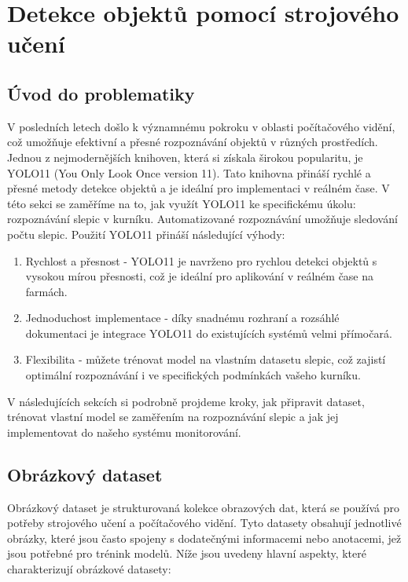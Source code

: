 \section{Detekce objektů pomocí strojového učení}\label{sec:detekce-objektu-pomoci-strojoveho-uceni}


\subsection*{Úvod do problematiky}\label{subsec:uvod-do-problematiky}
V posledních letech došlo k významnému pokroku v oblasti počítačového vidění, což umožňuje efektivní a přesné rozpoznávání objektů v různých prostředích.
Jednou z nejmodernějších knihoven, která si získala širokou popularitu, je YOLO11 (You Only Look Once version 11).
Tato knihovna přináší rychlé a přesné metody detekce objektů a je ideální pro implementaci v reálném čase.
V této sekci se zaměříme na to, jak využít YOLO11 ke specifickému úkolu: rozpoznávání slepic v kurníku.
Automatizované rozpoznávání umožňuje sledování počtu slepic.
Použití YOLO11 přináší následující výhody:

\begin{enumerate}
    \item Rychlost a přesnost - YOLO11 je navrženo pro rychlou detekci objektů s vysokou mírou přesnosti, což je ideální pro aplikování v reálném čase na farmách.
    \item Jednoduchost implementace - díky snadnému rozhraní a rozsáhlé dokumentaci je integrace YOLO11 do existujících systémů velmi přímočará.
    \item Flexibilita - můžete trénovat model na vlastním datasetu slepic, což zajistí optimální rozpoznávání i ve specifických podmínkách vašeho kurníku.
\end{enumerate}
V následujících sekcích si podrobně projdeme kroky, jak připravit dataset, trénovat vlastní model se zaměřením na rozpoznávání slepic a jak jej implementovat do našeho systému monitorování.

\subsection*{Obrázkový dataset}\label{subsec:obrazkovy-dataset}

Obrázkový dataset je strukturovaná kolekce obrazových dat, která se používá pro potřeby strojového učení a počítačového vidění.
Tyto datasety obsahují jednotlivé obrázky, které jsou často spojeny s dodatečnými informacemi nebo anotacemi, jež jsou potřebné pro trénink modelů.
Níže jsou uvedeny hlavní aspekty, které charakterizují obrázkové datasety:

